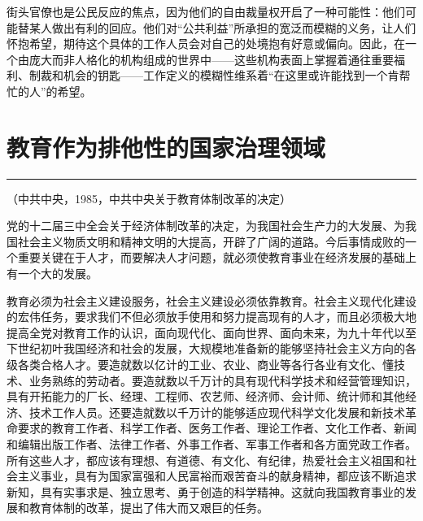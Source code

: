 \documentclass[12pt,a4paper]{article}
\begin{document}
街头官僚也是公民反应的焦点，因为他们的自由裁量权开启了一种可能性：他们可能替某人做出有利的回应。他们对“公共利益”所承担的宽泛而模糊的义务，让人们怀抱希望，期待这个具体的工作人员会对自己的处境抱有好意或偏向。因此，在一个由庞大而非人格化的机构组成的世界中——这些机构表面上掌握着通往重要福利、制裁和机会的钥匙——工作定义的模糊性维系着“在这里或许能找到一个肯帮忙的人”的希望。
\par{}
\newpage\section{教育作为排他性的国家治理领域}



\vspace{0.5em}



\vspace{0.3em}

\noindent\rule{\textwidth}{0.4pt}

\vspace{0.3em}





{\color{gray}\small （中共中央，1985，中共中央关于教育体制改革的决定）}



党的十二届三中全会关于经济体制改革的决定，为我国社会生产力的大发展、为我国社会主义物质文明和精神文明的大提高，开辟了广阔的道路。今后事情成败的一个重要关键在于人才，而要解决人才问题，就必须使教育事业在经济发展的基础上有一个大的发展。

教育必须为社会主义建设服务，社会主义建设必须依靠教育。社会主义现代化建设的宏伟任务，要求我们不但必须放手使用和努力提高现有的人才，而且必须极大地提高全党对教育工作的认识，面向现代化、面向世界、面向未来，为九十年代以至下世纪初叶我国经济和社会的发展，大规模地准备新的能够坚持社会主义方向的各级各类合格人才。要造就数以亿计的工业、农业、商业等各行各业有文化、懂技术、业务熟练的劳动者。要造就数以千万计的具有现代科学技术和经营管理知识，具有开拓能力的厂长、经理、工程师、农艺师、经济师、会计师、统计师和其他经济、技术工作人员。还要造就数以千万计的能够适应现代科学文化发展和新技术革命要求的教育工作者、科学工作者、医务工作者、理论工作者、文化工作者、新闻和编辑出版工作者、法律工作者、外事工作者、军事工作者和各方面党政工作者。所有这些人才，都应该有理想、有道德、有文化、有纪律，热爱社会主义祖国和社会主义事业，具有为国家富强和人民富裕而艰苦奋斗的献身精神，都应该不断追求新知，具有实事求是、独立思考、勇于创造的科学精神。这就向我国教育事业的发展和教育体制的改革，提出了伟大而又艰巨的任务。
\end{document}
